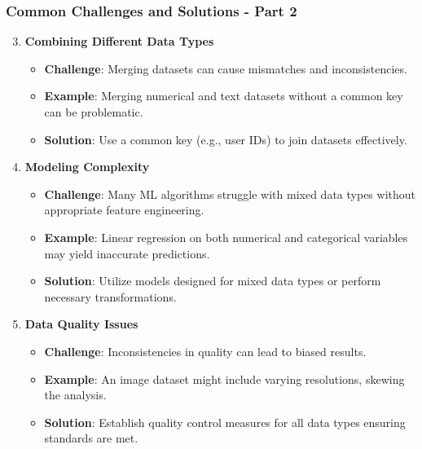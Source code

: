\documentclass[aspectratio=169]{beamer}
\begin{document}
\begin{frame}[fragile]
    \frametitle{Common Challenges and Solutions - Part 2}
    \begin{enumerate}
        \setcounter{enumi}{2}
        \item \textbf{Combining Different Data Types}
        \begin{itemize}
            \item \textbf{Challenge}: Merging datasets can cause mismatches and inconsistencies.
            \item \textbf{Example}: Merging numerical and text datasets without a common key can be problematic.
            \item \textbf{Solution}: Use a common key (e.g., user IDs) to join datasets effectively.
        \end{itemize}
        
        \item \textbf{Modeling Complexity}
        \begin{itemize}
            \item \textbf{Challenge}: Many ML algorithms struggle with mixed data types without appropriate feature engineering.
            \item \textbf{Example}: Linear regression on both numerical and categorical variables may yield inaccurate predictions.
            \item \textbf{Solution}: Utilize models designed for mixed data types or perform necessary transformations.
        \end{itemize}
        
        \item \textbf{Data Quality Issues}
        \begin{itemize}
            \item \textbf{Challenge}: Inconsistencies in quality can lead to biased results.
            \item \textbf{Example}: An image dataset might include varying resolutions, skewing the analysis.
            \item \textbf{Solution}: Establish quality control measures for all data types ensuring standards are met.
        \end{itemize}
    \end{enumerate}
\end{frame}
\end{document}
